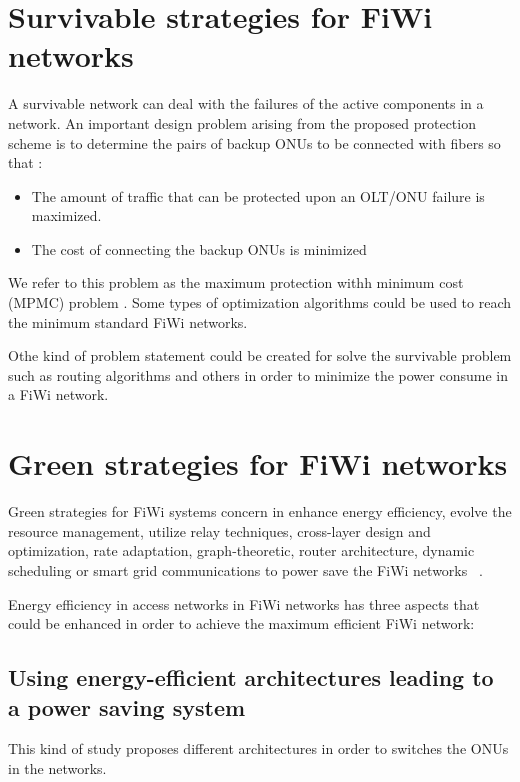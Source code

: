 \documentclass[conference,compsoc]{IEEEtran}
\begin{document}
\section{Survivable strategies for FiWi networks}%
A survivable network can deal with the failures of the active components in a network.
An important design problem arising from the proposed
protection scheme is to determine the pairs of backup ONUs
to be connected with fibers so that :
\begin{itemize}
\item The amount of traffic that can be protected upon an OLT/ONU failure is maximized.
             
\item The cost of connecting the backup ONUs is minimized
\end{itemize}

We refer to this problem as the maximum protection withh
minimum cost (MPMC) problem \cite{5759821}.
Some types of optimization algorithms could be used to reach the minimum
standard FiWi networks.

Othe kind of problem statement could be created for solve the survivable problem such as routing 
algorithms 
and others  in order to minimize the power consume in a FiWi network.



\section{Green strategies for FiWi networks}%
\label{section:gremst}


Green strategies for FiWi systems concern in enhance energy efficiency, 
evolve the resource management, utilize relay techniques, cross-layer design 
and optimization, rate adaptation, graph-theoretic, router architecture, 
dynamic scheduling or smart grid communications to power save the FiWi 
networks ~\cite{yu2012green}.

Energy efficiency in access networks in FiWi networks has three aspects that could be enhanced in 
order to achieve the maximum efficient FiWi network:


\subsection{Using energy-efficient architectures  leading to a power saving system}
This kind of study proposes different architectures in order to switches the ONUs in the networks.
\end{document}
